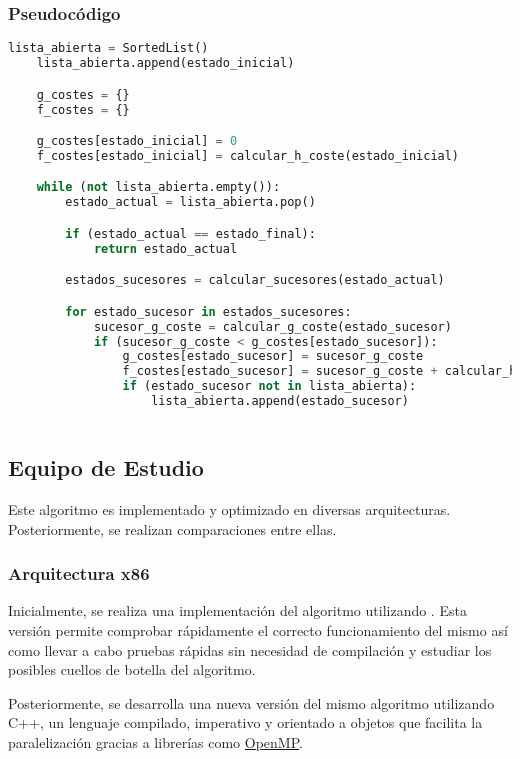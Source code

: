 \subsubsection{Pseudocódigo}

\begin{lstlisting}[language=Python]
    lista_abierta = SortedList()
    lista_abierta.append(estado_inicial)

    g_costes = {}
    f_costes = {}

    g_costes[estado_inicial] = 0
    f_costes[estado_inicial] = calcular_h_coste(estado_inicial)

    while (not lista_abierta.empty()):
        estado_actual = lista_abierta.pop()

        if (estado_actual == estado_final):
            return estado_actual

        estados_sucesores = calcular_sucesores(estado_actual)

        for estado_sucesor in estados_sucesores:
            sucesor_g_coste = calcular_g_coste(estado_sucesor)
            if (sucesor_g_coste < g_costes[estado_sucesor]):
                g_costes[estado_sucesor] = sucesor_g_coste
                f_costes[estado_sucesor] = sucesor_g_coste + calcular_h_coste(estado_sucesor)
                if (estado_sucesor not in lista_abierta):
                    lista_abierta.append(estado_sucesor)
            
\end{lstlisting}

\subsection{Equipo de Estudio}

Este algoritmo es implementado y optimizado en diversas arquitecturas.
Posteriormente, se realizan comparaciones entre ellas.

\subsubsection{Arquitectura x86}

Inicialmente, se realiza una implementación del algoritmo utilizando \Python.
Esta versión permite comprobar rápidamente el correcto funcionamiento del mismo
así como llevar a cabo pruebas rápidas sin necesidad de compilación y
estudiar los posibles cuellos de botella del algoritmo.

Posteriormente, se desarrolla una nueva versión del mismo algoritmo
utilizando C++, un lenguaje compilado, imperativo y orientado a objetos
que facilita la paralelización gracias a librerías como 
\href{https://www.openmp.org/}{OpenMP}\@.

